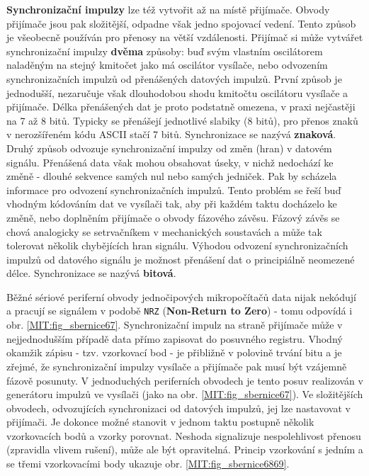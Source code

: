         \textbf{Synchronizační impulzy} lze též vytvořit až na místě přijímače. Obvody přijímače
        jsou pak složitější, odpadne však jedno spojovací vedení. Tento způsob je všeobecně používán
        pro přenosy na větší vzdálenosti. Přijímač si může vytvářet synchronizační impulzy
        \textbf{dvěma} způsoby: buď svým vlastním oscilátorem naladěným na stejný kmitočet jako má
        oscilátor vysílače, nebo odvozením synchronizačních impulzů od přenášených datových impulzů.
        První způsob je jednodušší, nezaručuje však dlouhodobou shodu kmitočtu oscilátoru vysílače a
        přijímače. Délka přenášených dat je proto podstatně omezena, v praxi nejčastěji na 7 až 8
        bitů. Typicky se přenášejí jednotlivé slabiky (8 bitů), pro přenos znaků v nerozšířeném kódu
        ASCII stačí 7 bitů. Synchronizace se nazývá \textbf{znaková}. Druhý způsob odvozuje
        synchronizační impulzy od změn (hran) v datovém signálu. Přenášená data však mohou obsahovat
        úseky, v nichž nedochází ke změně - dlouhé sekvence samých nul nebo samých jedniček. Pak by
        scházela informace pro odvození synchronizačních impulzů. Tento problém se řeší buď vhodným
        kódováním dat ve vysílači tak, aby při každém taktu docházelo ke změně, nebo doplněním
        přijímače o obvody fázového závěsu. Fázový závěs se chová analogicky se setrvačníkem v
        mechanických soustavách a může tak tolerovat několik chybějících hran signálu. Výhodou
        odvození synchronizačních impulzů od datového signálu je možnost přenášení dat o
        principiálně neomezené délce. Synchronizace se nazývá \textbf{bitová}.
        
        Běžné sériové periferní obvody jednočipových mikropočítačů data nijak nekódují a pracují se
        signálem v podobě \texttt{NRZ} (\textbf{Non-Return to Zero}) - tomu odpovídá i obr.
        \ref{MIT:fig_sbernice67}. Synchronizační impulz na straně přijímače může v nejjednodušším
        případě data přímo zapisovat do posuvného registru. Vhodný okamžik zápisu - tzv. vzorkovací
        bod - je přibližně v polovině trvání bitu a je zřejmé, že synchronizační impulzy vysílače a
        přijímače pak musí být vzájemně fázově posunuty. V jednoduchých periferních obvodech je
        tento posuv realizován v generátoru impulzů ve vysílači (jako na obr.
        \ref{MIT:fig_sbernice67}). Ve složitějších obvodech, odvozujících synchronizaci od datových
        impulzů, jej lze nastavovat v přijímači. Je dokonce možné stanovit v jednom taktu postupně
        několik vzorkovacích bodů a vzorky porovnat. Neshoda signalizuje nespolehlivost přenosu
        (zpravidla vlivem rušení), může ale být opravitelná. Princip vzorkování s jedním a se třemi
        vzorkovacími body ukazuje obr. \ref{MIT:fig_sbernice6869}.
        
